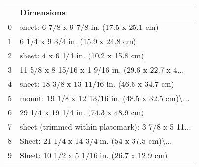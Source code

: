 \begin{tabular}{ll}
\toprule
{} &                                         Dimensions \\
\midrule
0 &          sheet: 6 7/8 x 9 7/8 in. (17.5 x 25.1 cm) \\
1 &                 6 1/4 x 9 3/4 in. (15.9 x 24.8 cm) \\
2 &              sheet: 4 x 6 1/4 in. (10.2 x 15.8 cm) \\
3 &  11 5/8 x 8 15/16 x 1 9/16 in. (29.6 x 22.7 x 4... \\
4 &      sheet: 18 3/8 x 13 11/16 in. (46.6 x 34.7 cm) \\
5 &  mount: 19 1/8 x 12 13/16 in. (48.5 x 32.5 cm)\textbackslash... \\
6 &               29 1/4 x 19 1/4 in. (74.3 x 48.9 cm) \\
7 &  sheet (trimmed within platemark): 3 7/8 x 5 11... \\
8 &  Sheet: 21 1/4 x 14 3/4 in. (54 x 37.5 cm)\textbackslash... \\
9 &        Sheet: 10 1/2 x 5 1/16 in. (26.7 x 12.9 cm) \\
\bottomrule
\end{tabular}
